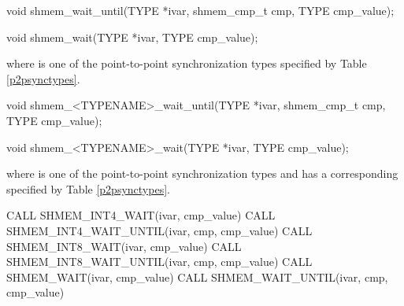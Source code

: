
\begin{apidefinition}

\begin{C11synopsis}
void shmem_wait_until(TYPE *ivar, shmem_cmp_t cmp, TYPE cmp_value);
\end{C11synopsis}
\begin{DeprecateBlock}
\begin{CsynopsisCol}
void shmem_wait(TYPE *ivar, TYPE cmp_value);
\end{CsynopsisCol}
\end{DeprecateBlock}
where \TYPE{} is one of the point-to-point synchronization types specified by
Table \ref{p2psynctypes}.

\begin{Csynopsis}
void shmem_<TYPENAME>_wait_until(TYPE *ivar, shmem_cmp_t cmp, TYPE cmp_value);
\end{Csynopsis}
\begin{DeprecateBlock}
\begin{CsynopsisCol}
void shmem_<TYPENAME>_wait(TYPE *ivar, TYPE cmp_value);
\end{CsynopsisCol}
\end{DeprecateBlock}
where \TYPE{} is one of the point-to-point synchronization types and has a
corresponding \TYPENAME{} specified by Table \ref{p2psynctypes}.

\begin{DeprecateBlock}
\begin{Fsynopsis}
CALL SHMEM_INT4_WAIT(ivar, cmp_value)
CALL SHMEM_INT4_WAIT_UNTIL(ivar, cmp, cmp_value)
CALL SHMEM_INT8_WAIT(ivar, cmp_value)
CALL SHMEM_INT8_WAIT_UNTIL(ivar, cmp, cmp_value)
CALL SHMEM_WAIT(ivar, cmp_value)
CALL SHMEM_WAIT_UNTIL(ivar, cmp, cmp_value)
\end{Fsynopsis}
\end{DeprecateBlock}

\begin{apiarguments}



\end{apiarguments}
\end{apidefinition}
